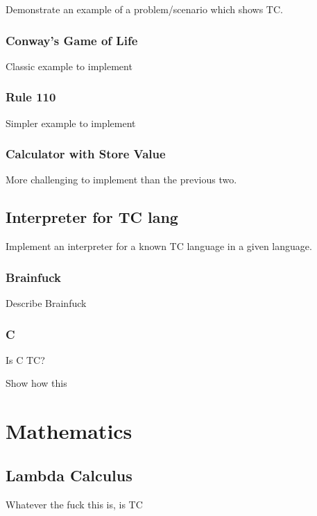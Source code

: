 Demonstrate an example of a problem/scenario which shows TC.

\subsubsection{Conway's Game of Life}

Classic example to implement

\subsubsection{Rule 110}

Simpler example to implement

\subsubsection{Calculator with Store Value}

More challenging to implement than the previous two.

\subsection{Interpreter for TC lang}

Implement an interpreter for a known TC language in a given language.

\subsubsection{Brainfuck}

Describe Brainfuck

\subsubsection{C}

Is C TC?

Show how this

\section{Mathematics}

\subsection{Lambda Calculus}

Whatever the fuck this is, is TC
